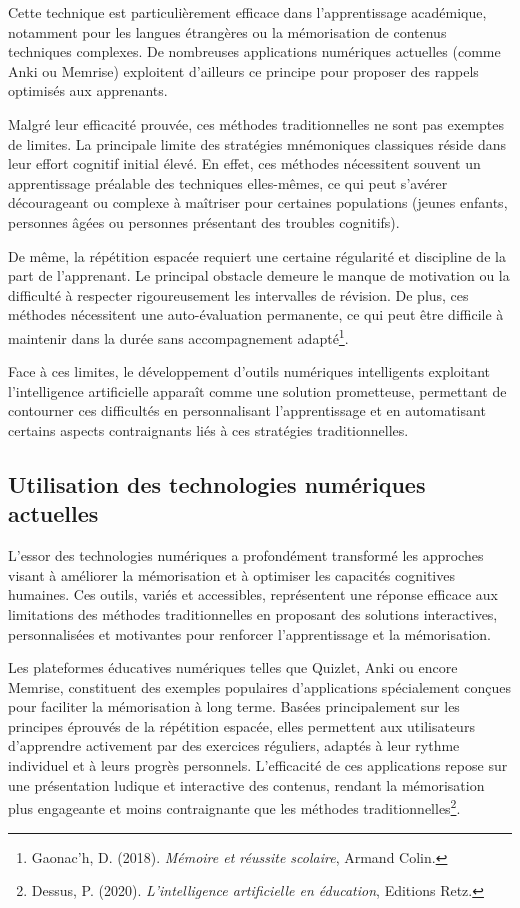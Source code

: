 \documentclass[11pt,a4paper]{report}
\begin{document}
Cette technique est particulièrement efficace dans l’apprentissage académique, notamment pour les langues étrangères ou la mémorisation de contenus techniques complexes. De nombreuses applications numériques actuelles (comme Anki ou Memrise) exploitent d’ailleurs ce principe pour proposer des rappels optimisés aux apprenants.

Malgré leur efficacité prouvée, ces méthodes traditionnelles ne sont pas exemptes de limites. La principale limite des stratégies mnémoniques classiques réside dans leur effort cognitif initial élevé. En effet, ces méthodes nécessitent souvent un apprentissage préalable des techniques elles-mêmes, ce qui peut s’avérer décourageant ou complexe à maîtriser pour certaines populations (jeunes enfants, personnes âgées ou personnes présentant des troubles cognitifs).

De même, la répétition espacée requiert une certaine régularité et discipline de la part de l’apprenant. Le principal obstacle demeure le manque de motivation ou la difficulté à respecter rigoureusement les intervalles de révision. De plus, ces méthodes nécessitent une auto-évaluation permanente, ce qui peut être difficile à maintenir dans la durée sans accompagnement adapté\footnote{Gaonac'h, D. (2018). \textit{Mémoire et réussite scolaire}, Armand Colin.}.

Face à ces limites, le développement d’outils numériques intelligents exploitant l'intelligence artificielle apparaît comme une solution prometteuse, permettant de contourner ces difficultés en personnalisant l'apprentissage et en automatisant certains aspects contraignants liés à ces stratégies traditionnelles.

\subsection{Utilisation des technologies numériques actuelles}

L’essor des technologies numériques a profondément transformé les approches visant à améliorer la mémorisation et à optimiser les capacités cognitives humaines. Ces outils, variés et accessibles, représentent une réponse efficace aux limitations des méthodes traditionnelles en proposant des solutions interactives, personnalisées et motivantes pour renforcer l’apprentissage et la mémorisation.

Les plateformes éducatives numériques telles que Quizlet, Anki ou encore Memrise, constituent des exemples populaires d’applications spécialement conçues pour faciliter la mémorisation à long terme. Basées principalement sur les principes éprouvés de la répétition espacée, elles permettent aux utilisateurs d’apprendre activement par des exercices réguliers, adaptés à leur rythme individuel et à leurs progrès personnels. L'efficacité de ces applications repose sur une présentation ludique et interactive des contenus, rendant la mémorisation plus engageante et moins contraignante que les méthodes traditionnelles\footnote{Dessus, P. (2020). \textit{L'intelligence artificielle en éducation}, Editions Retz.}.
\end{document}
